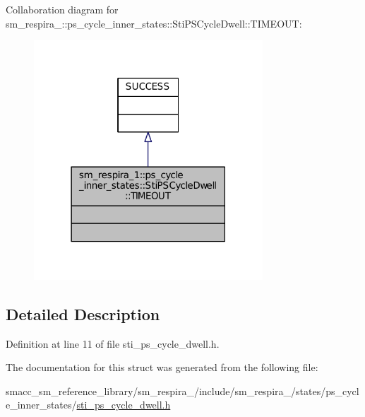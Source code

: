 Collaboration diagram for sm\+\_\+respira\+\_\+:\+:ps\+\_\+cycle\+\_\+inner\+\_\+states\+:\+:Sti\+P\+S\+Cycle\+Dwell\+:\+:T\+I\+M\+E\+O\+UT\+:
\nopagebreak
\begin{figure}[H]
\begin{center}
\leavevmode
\includegraphics[width=243pt]{structsm__respira__1_1_1ps__cycle__inner__states_1_1StiPSCycleDwell_1_1TIMEOUT__coll__graph}
\end{center}
\end{figure}


\subsection{Detailed Description}


Definition at line 11 of file sti\+\_\+ps\+\_\+cycle\+\_\+dwell.\+h.



The documentation for this struct was generated from the following file\+:\begin{DoxyCompactItemize}
\item 
smacc\+\_\+sm\+\_\+reference\+\_\+library/sm\+\_\+respira\+\_/include/sm\+\_\+respira\+\_/states/ps\+\_\+cycle\+\_\+inner\+\_\+states/\hyperlink{sti__ps__cycle__dwell_8h}{sti\+\_\+ps\+\_\+cycle\+\_\+dwell.\+h}\end{DoxyCompactItemize}
